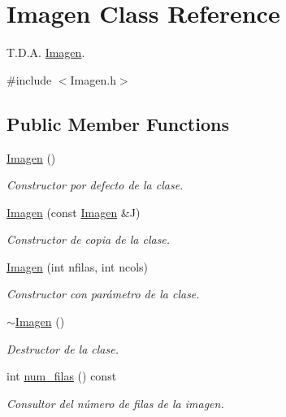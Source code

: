 \hypertarget{classImagen}{}\section{Imagen Class Reference}
\label{classImagen}


T.\+D.\+A. \hyperlink{classImagen}{Imagen}.  




{\ttfamily \#include $<$Imagen.\+h$>$}

\subsection*{Public Member Functions}
\begin{DoxyCompactItemize}
\item 
\hyperlink{classImagen_ab2e649aa7a105155c7bfdb846abf0528}{Imagen} ()
\begin{DoxyCompactList}\small\item\em Constructor por defecto de la clase. \end{DoxyCompactList}\item 
\hyperlink{classImagen_a70437d2848ae5b030ee17cf79651a8b5}{Imagen} (const \hyperlink{classImagen}{Imagen} \&J)
\begin{DoxyCompactList}\small\item\em Constructor de copia de la clase. \end{DoxyCompactList}\item 
\hyperlink{classImagen_a9b34329ba89308633e8a8fe5627b50dc}{Imagen} (int nfilas, int ncols)
\begin{DoxyCompactList}\small\item\em Constructor con parámetro de la clase. \end{DoxyCompactList}\item 
\mbox{\label{classImagen_a03dd93c9cf920a9dc0b72f8bd34f2e8a}} 
\hyperlink{classImagen_a03dd93c9cf920a9dc0b72f8bd34f2e8a}{$\sim$\+Imagen} ()
\begin{DoxyCompactList}\small\item\em Destructor de la clase. \end{DoxyCompactList}\item 
int \hyperlink{classImagen_a4cb4faa04f5e2913965e43a6a65acfd1}{num\+\_\+filas} () const
\begin{DoxyCompactList}\small\item\em Consultor del número de filas de la imagen. \end{DoxyCompactList}\item 

\end{DoxyCompactItemize}

